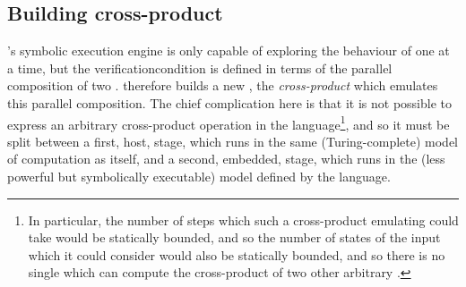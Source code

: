 \subsection{Building cross-product {\StateMachines}}
\label{sect:using:build_cross_product}

{\Technique}'s symbolic execution engine is only capable of exploring
the behaviour of one {\StateMachine} at a time, but the
\gls{verificationcondition} is defined in terms of the parallel
composition of two {\StateMachines}.  {\Technique} therefore builds a
new {\StateMachine}, the \emph{cross-product {\StateMachine}} which
emulates this parallel composition.  The chief complication here is
that it is not possible to express an arbitrary cross-product
operation in the {\StateMachine} language\footnote{In particular, the
  number of steps which such a cross-product emulating {\StateMachine}
  could take would be statically bounded, and so the number of states
  of the input {\StateMachines} which it could consider would also be
  statically bounded, and so there is no single {\StateMachine} which
  can compute the cross-product of two other arbitrary
  {\StateMachines}.}, and so it must be split between a first, host,
stage, which runs in the same (Turing-complete) model of computation
as {\technique} itself, and a second, embedded, stage, which runs in
the (less powerful but symbolically executable) model defined by the
{\StateMachine} language.

